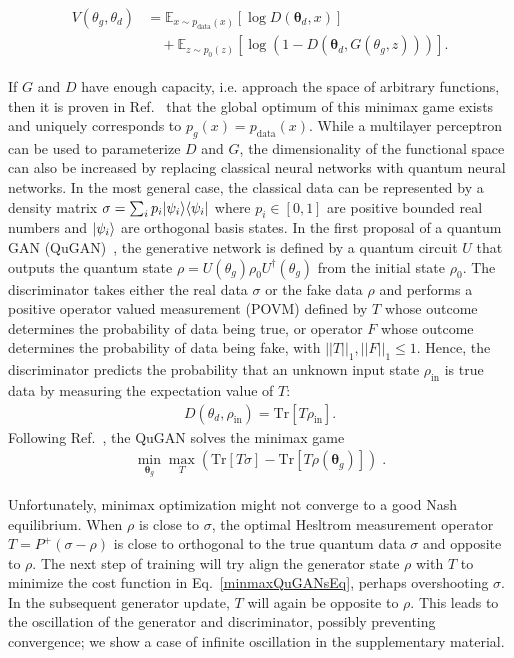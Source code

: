 \documentclass[prl,superscriptaddress,twocolumn]{revtex4}
\makeatletter
\newcommand{\sket}[1]{{\ensuremath{\lvert#1\rangle}}}
\newcommand{\lket}[1]{{\ensuremath{\left\lvert#1\right\rangle}}}
\newcommand{\ket}[1]{\if@display\lket{#1}\else\sket{#1}\fi}
\newcommand{\sbra}[1]{{\ensuremath{\langle#1\rvert}}}
\newcommand{\lbra}[1]{{\ensuremath{\left\langle#1\right\rvert}}}
\newcommand{\bra}[1]{\if@display\lbra{#1}\else\sbra{#1}\fi}
\theoremstyle{plain}
\theoremstyle{definition}
\makeatother
\begin{document}
\begin{align}
\begin{split}
\label{eq:classical}
  V(\theta_g, \theta_d) &= \mathbb{E}_{x\sim p_\mathrm{data}(x)} \left[\log D(\mathbf{\theta}_d, x) \right] \\
  				  &\quad+ \mathbb{E}_{z\sim p_0(z)} \left[\log\left(1-D(\mathbf{\theta}_d, G(\theta_g, z))\right)\right].
\end{split}
\end{align}

If $G$ and $D$ have enough capacity, i.e. approach the space of arbitrary functions, then it is proven in Ref.~\cite{goodfellow2014generative} that the global optimum of this minimax game exists and uniquely corresponds to $p_g(x) = p_\mathrm{data}(x)$. While a multilayer perceptron can be used to parameterize $D$ and $G$, the dimensionality of the functional space can also be increased by replacing classical neural networks with quantum neural networks. In the most general case, the classical data can be represented by a density matrix $\sigma=\sum_i p_i \ket{\psi_i}\bra{\psi_i}$ where $p_i \in [0,1]$ are positive bounded real numbers and $\ket{\psi_i}$ are orthogonal basis states. In the first proposal of a quantum GAN (QuGAN)~\cite{PhysRevA.98.012324,Lloyd2018}, the generative network is defined by a quantum circuit $U$ that outputs the quantum state $\rho=U(\theta_g)\rho_0 U^\dagger(\theta_g)$ from the initial state $\rho_0$. The discriminator takes either the real data $\sigma$ or the fake data $\rho$ and performs a positive operator valued measurement (POVM) defined by    $T$ whose outcome determines the probability of data being true,  or operator $F$ whose outcome determines the probability of data being fake, with $||T||_1, ||F||_1 \leq 1$. Hence, the discriminator predicts the probability that an unknown input state $\rho_\mathrm{in}$ is true data by measuring the expectation value of $T$:
\begin{align}
    D(\theta_d, \rho_\mathrm{in}) = \text{Tr}[T \rho_\mathrm{in}].
\end{align}
Following Ref.~\cite{Lloyd2018}, the QuGAN solves the minimax game
\begin{align}
\label{minmaxQuGANsEq}
    \min_{\mathbf{\theta}_g}\max_{T}\left( \text{Tr}[T
    \sigma] - \text{Tr}[T
    \rho(\mathbf{\theta}_g)]\right)\;.
\end{align} 

Unfortunately, minimax optimization might not converge to a good Nash equilibrium. When $\rho$  is close to $\sigma$, the optimal Hesltrom measurement operator $T = P^+(\sigma-\rho)$ is close to orthogonal to the true quantum data $\sigma$ and opposite to $\rho$. The next step of training will try align the generator state $\rho$ with $T$ to minimize the cost function in Eq.~\ref{minmaxQuGANsEq}, perhaps overshooting $\sigma$. In the subsequent generator update, $T$ will again be opposite to $\rho$. This leads to the oscillation of the generator and discriminator, possibly preventing convergence; we show a case of infinite oscillation in the supplementary material.
 
\end{document}
